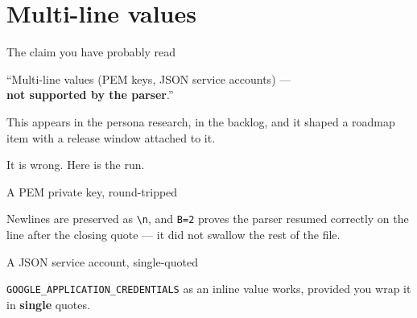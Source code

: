 \documentclass[aspectratio=169,10pt]{beamer}
\begin{document}
\section{Multi-line values}

\begin{frame}{The claim you have probably read}
  \begin{center}\Large
  ``Multi-line values (PEM keys, JSON service accounts) --- \\
  \textbf{not supported by the parser}.''
  \end{center}

  \vspace{1.2em}
  This appears in the persona research, in the backlog, and it shaped a
  roadmap item with a release window attached to it.

  \vspace{1.2em}
  \begin{center}\large It is wrong. Here is the run.\end{center}

\end{frame}

\begin{frame}[fragile]{A PEM private key, round-tripped}

  \vspace{0.4em}
  {\footnotesize Newlines are preserved as \texttt{\textbackslash n}, and
  \texttt{B=2} proves the parser resumed correctly on the line after the
  closing quote --- it did not swallow the rest of the file.}
\end{frame}

\begin{frame}[fragile]{A JSON service account, single-quoted}

  \vspace{0.4em}
  {\footnotesize \texttt{GOOGLE\_APPLICATION\_CREDENTIALS} as an inline value
  works, provided you wrap it in \textbf{single} quotes.}
\end{frame}
\end{document}
